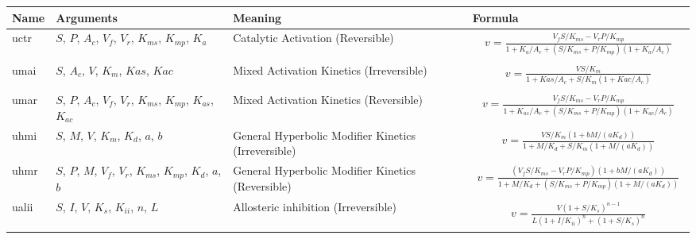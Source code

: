 \documentclass[10pt]{cekarticle}
\begin{document}
\addtocounter{table}{-1}
\begin{table}[ht]
\setlength{\abovedisplayskip}{-2pt}
\setlength{\belowdisplayskip}{1pt}
\begin{tabular}{|p{0.45in}|>{\raggedright}m{0.77in}|>{\raggedright}m{1.2in}|m{3.46in}|}
\hline
\textbf{Name} & \textbf{Arguments} & \textbf{Meaning} & \textbf{Formula} \\
\hline

uctr & $S$, $P$, $A_c$, $V_f$, $V_r$, $K_{ms}$, $K_{mp}$, $K_a$ &
Catalytic Activation (Reversible) &
\begin{gather*}
v = \frac{V_f S/K_{ms} - V_r P/K_{mp}}{1 +
K_a/A_c + \left( S/K_{ms} + P/K_{mp}\right) \left( 1 + K_a/A_c\right)}
\end{gather*}
\\ \hline

umai & $S$, $A_c$, $V$, $K_m$, $Kas$, $Kac$ & Mixed Activation
Kinetics (Irreversible) &
\begin{gather*}
v = \frac{V S/K_m}{1 + Kas/A_c + S/K_m \left( 1 + Kac/A_c\right)}
\end{gather*}
\\ \hline

umar & $S$, $P$, $A_c$, $V_f$, $V_r$, $K_{ms}$, $K_{mp}$, $K_{as}$, $K_{ac}$ &
Mixed Activation Kinetics (Reversible) &
\begin{gather*}
v = \frac{V_f S/K_{ms} - V_r P/K_{mp}}{1 + K_{as}/A_c + \left( S/K_{ms} +
    P/K_{mp}\right) \left( 1 + K_{ac}/A_c\right)}
\end{gather*}
\\ \hline

uhmi & $S$, $M$, $V$, $K_m$, $K_d$, $a$, $b$ & General Hyperbolic
Modifier Kinetics (Irreversible) &
\begin{gather*}
v = \frac{V S/K_m \left( 1 + b
M / (a K_d)\right) }{1 + M/K_d + S/K_m \left( 1 + M/(a K_d)\right)}
\end{gather*}
\\ \hline

uhmr & $S$, $P$, $M$, $V_f$, $V_r$, $K_{ms}$, $K_{mp}$, $K_d$, $a$, $b$ &
General Hyperbolic Modifier Kinetics (Reversible) &
\begin{gather*}
v = \frac{\left( V_f S/K_{ms} - V_r P/K_{mp}\right) \left( 1 + b M / (a
K_d)\right) }{1 + M/K_d + \left( S/K_{ms} + P/K_{mp} \right) \left( 1 +
M/(a K_d)\right)}
\end{gather*}
\\ \hline

ualii & $S$, $I$, $V$, $K_s$, $K_{ii}$, $n$, $L$ & Allosteric inhibition
(Irreversible) &
\begin{gather*}
v = \frac{V \left( 1 + S/K_s\right)^{n-1}}{L \left(
1 + I/K_{ii}\right)^n + \left( 1 + S/K_s \right)^n}
\end{gather*}
\\ \hline


\end{tabular}
\end{table}
\end{document}
